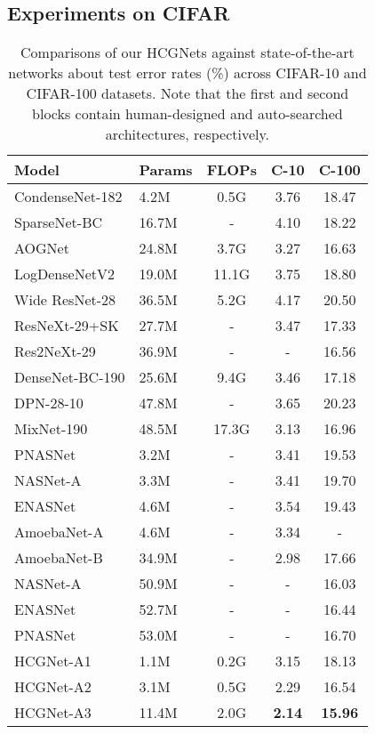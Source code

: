 \documentclass[letterpaper]{article}
\begin{document}
 	\subsection{Experiments on CIFAR}
 	\begin{table}[tbp]
 		\centering 
 		\caption{Comparisons of our HCGNets against state-of-the-art  networks about test error rates (\%) across CIFAR-10 and CIFAR-100 datasets. Note that the first and second blocks contain human-designed and auto-searched architectures, respectively.}
 		\label{table1}  
 		\begin{tabular}{llccc}  
 			\toprule
 			Model&Params&FLOPs&C-10&C-100 \\  
 			\midrule
 			CondenseNet-182&4.2M&0.5G&3.76&18.47 \\
 			SparseNet-BC&16.7M&-&4.10&18.22\\
 		AOGNet&24.8M&3.7G&3.27&16.63\\
 			LogDenseNetV2 &19.0M&11.1G&3.75&18.80 \\
 			Wide ResNet-28&36.5M&5.2G&4.17&20.50\\
 			ResNeXt-29+SK &27.7M&-&3.47&17.33 \\
 			Res2NeXt-29 &36.9M&-&-&16.56 \\
 			DenseNet-BC-190 &25.6M&9.4G&3.46&17.18 \\
 			DPN-28-10&47.8M&-&3.65&20.23 \\
 			MixNet-190&48.5M&17.3G&3.13&16.96 \\
 			
 			\midrule
 			PNASNet&3.2M&-&3.41&19.53 \\
 			NASNet-A&3.3M&-&3.41&19.70\\
 			ENASNet&4.6M&-&3.54&19.43\\
 			AmoebaNet-A&4.6M&-&3.34&-\\
 			AmoebaNet-B&34.9M&-&2.98&17.66\\
 			NASNet-A &50.9M&-&-&16.03\\
 			ENASNet&52.7M&-&-&16.44\\
 			PNASNet&53.0M&-&-&16.70\\
 			\midrule
 			
 			HCGNet-A1&1.1M&0.2G&3.15&18.13\\
 			HCGNet-A2&3.1M&0.5G&2.29&16.54\\
 			HCGNet-A3&11.4M&2.0G&\textbf{2.14}&\textbf{15.96} \\
 			\bottomrule
 		\end{tabular}
 		
 	\end{table}
 	
\end{document}

